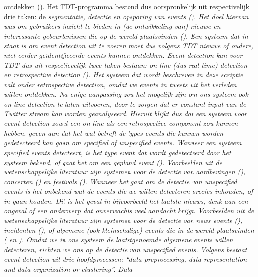 ontdekken ({\citealt{allan2002introduction}). Het TDT-programma bestond dus oorspronkelijk uit 
respectivelijk drie taken: de \it{segmentatie}, \it{detectie} en \it{opsporing} van events 
(\citealt{atefeh2013survey}). Het doel hiervan was om gebruikers inzicht te bieden in (de 
ontwikkeling van) nieuwe en interessante gebeurtenissen die op de wereld 
plaatsvinden ({\citealt{allan2002introduction}).
\vl
Een systeem dat in staat is om event detection uit te voeren moet dus volgens 
TDT nieuwe of oudere, niet eerder ge\"identificeerde events kunnen ontdekken. 
Event detection kan voor TDT dus uit respectievelijk twee taken bestaan: \it{on-line} (dus 
\it{real-time}) \it{detection} en \it{retrospective detection} (\citealt{yang1998study}). Het systeem dat 
wordt beschreven in deze scriptie valt onder retrospective detection, 
omdat we events in tweets uit het verleden willen ontdekken. Na enige aanpassing 
zou het mogelijk zijn om ons systeem ook on-line detection te laten uitvoeren, door te 
zorgen dat er constant input van de Twitter stream kan worden geanalyseerd. 
Hieruit blijkt dus dat een systeem voor event detection zowel een on-line als een retrospective 
component zou kunnen hebben.
\vl
\citeauthor{atefeh2013survey} geven aan dat het wat betreft de types events die kunnen worden 
gedetecteerd kan gaan om \it{specified} of \it{unspecified} events. Wanneer een systeem 
specified events detecteert, is het type event dat wordt gedetecteerd door het 
systeem bekend, of gaat het om een gepland event (\citealt{atefeh2013survey}). Voorbeelden 
uit de wetenschappelijke literatuur zijn systemen voor de detectie van 
aardbevingen (\citealt{sakaki2010earthquake}), concerten (\citealt{benson2011event}) en festivals (\citealt{lee2010measuring}). 
Wanneer het gaat om de detectie van unspecified events is het onbekend wat 
de events die we willen detecteren precies inhouden, of in gaan houden. Dit is 
het geval in bijvoorbeeld het laatste nieuws, denk aan een ongeval 
of een onderwerp dat onverwachts veel aandacht krijgt. Voorbeelden uit de 
wetenschappelijke literatuur zijn systemen voor de detectie van news events
(\citealt{sankaranarayanan2009twitterstand}), incidenten (\citealt{abel2012twitcident}), of algemene (ook kleinschalige) events die in de wereld
plaatsvinden (\citealt{walther2013geo} en \citealt{becker2011beyond}). Omdat we in ons systeem de laatstgenoemde
algemene events willen detecteren, richten we ons op de detectie van unspecified
events.
\vl
Volgens \citeauthor{atefeh2013survey} bestaat event detection uit drie hoofdprocessen: \it{``data 
preprocessing, data representation and data organization or clustering''}. \it{Data 
}}}
